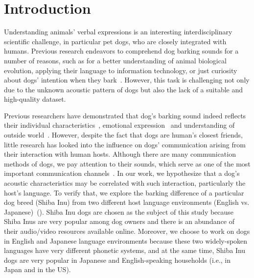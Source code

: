 \section{Introduction}
\label{sec:intro}

Understanding animals' verbal expressions is an interesting interdisciplinary scientific challenge, 
in particular pet dogs, who are closely integrated with humans. 
Previous research endeavors to comprehend dog barking sounds for a number of reasons, such as for a better understanding of animal biological evolution\cite{pongracz2017modeling}, applying their language to information technology, or just curiosity about dogs' intention when they bark~\cite{pongracz2011children,dogbark_1}. However, this task is challenging not only due to the unknown acoustic pattern of dogs but also the lack of a suitable and high-quality dataset.

Previous researchers have demonstrated that dog's barking sound indeed reflects their individual characteristics~\cite{pongracz2010barking,larranaga2015comparing}, emotional expression~\cite{thorndike2017animal,hantke2018my,paladini2020bark} and understanding of outside world~\cite{larranaga2015comparing, molnar2008classification}. However, despite the fact that dogs are human's closest friends, little research has looked into the influence on dogs' communication arising from their interaction with human hosts. Although there are many communication methods of dogs, we pay attention to their sounds, which serve as one of the most important communication  channels~\cite{siniscalchi2018communication}. In our work, we hypothesize that a dog's acoustic characteristics may be correlated with such interaction, particularly the host's language. To verify that, we explore the barking difference of a particular dog breed (Shiba Inu) from two different host language environments (English vs. Japanese)~(). Shiba Inu dogs are chosen as the subject of this study because Shiba Inus are very popular among dog owners and there is an abundance of their audio/video resources available online.  Moreover, we choose to work on dogs in English and Japanese language environments because these two widely-spoken languages have very different phonetic systems, and at the same time, Shiba Inu dogs are very popular in Japanese and English-speaking households (i.e., in Japan and in the US).

